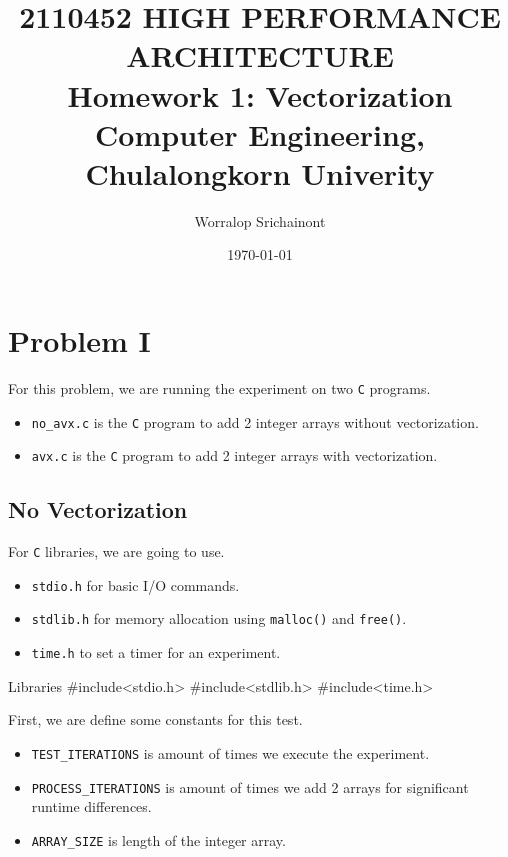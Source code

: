 \documentclass[12pt, a4paper]{article}
\title {
	\textbf{2110452 HIGH PERFORMANCE ARCHITECTURE} \\
    \vspace{1em}
	\Large{\textbf{Homework 1: Vectorization}} \\
    \vspace{0.5em}
    \large{Computer Engineering, Chulalongkorn Univerity}
}
\author{Worralop Srichainont}
\date{\today}
\begin{document}
    \maketitle
    \thispagestyle{empty}
    \clearpage

    \tableofcontents
    \thispagestyle{empty}
    \clearpage


    \section{Problem I}
        For this problem, we are running the experiment on two \texttt{C} programs.
        \begin{itemize}
            \item \texttt{no\_avx.c} is the \texttt{C} program to add 2 integer arrays without vectorization.
            \item \texttt{avx.c} is the \texttt{C} program to add 2 integer arrays with vectorization.
        \end{itemize}

        \subsection{No Vectorization}
            For \texttt{C} libraries, we are going to use.
            \begin{itemize}
                \item \texttt{stdio.h} for basic I/O commands.
                \item \texttt{stdlib.h} for memory allocation using \texttt{malloc()} and \texttt{free()}.
                \item \texttt{time.h} to set a timer for an experiment.
            \end{itemize}

            \begin{codeblock}[minted language=c]{Libraries}
                #include<stdio.h>
                #include<stdlib.h>
                #include<time.h>
            \end{codeblock}

            First, we are define some constants for this test.
            \begin{itemize}
                \item \texttt{TEST\_ITERATIONS} is amount of times we execute the experiment.
                \item \texttt{PROCESS\_ITERATIONS} is amount of times we add 2 arrays for significant runtime differences.
                \item \texttt{ARRAY\_SIZE} is length of the integer array.
            \end{itemize}
\end{document}
